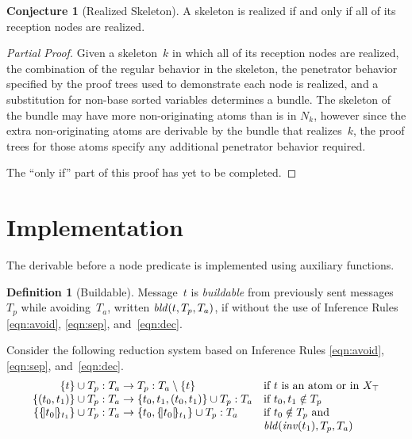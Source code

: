 \documentclass[12pt]{report}
\theoremstyle{definition}
\newtheorem{defn}{Definition}[chapter]
\newtheorem{conj}[thm]{Conjecture}
\begin{document}
\begin{conj}[Realized Skeleton]
A skeleton is realized if and only if all of its reception nodes are
realized.
\end{conj}

\begin{proof}[Partial Proof]
Given a skeleton~$k$ in which all of its reception nodes are realized,
the combination of the regular behavior in the skeleton, the
penetrator behavior specified by the proof trees used to demonstrate
each node is realized, and a substitution for non-base sorted
variables determines a bundle.  The skeleton of the bundle may have
more non-originating atoms than is in $N_k$, however since the
extra non-originating atoms are derivable by the bundle that
realizes~$k$, the proof trees for those atoms specify any additional
penetrator behavior required.

The ``only if'' part of this proof has yet to be completed.
\end{proof}

\section{Implementation}\label{sec:derivable implementation}

The derivable before a node predicate is implemented using auxiliary
functions.

\begin{defn}[Buildable]
Message~$t$ is \emph{buildable} from previously sent
messages~$T_p$ while avoiding~$T_a$, written $\operatorname{\mathit{bld}}(t,T_p,T_a)$, if
 without the use of Inference Rules \ref{eqn:avoid},
\ref{eqn:sep}, and~\ref{eqn:dec}.
\end{defn}

Consider the following reduction system based on Inference Rules
\ref{eqn:avoid}, \ref{eqn:sep}, and~\ref{eqn:dec}.
$$\begin{array}{r@{}c@{}ll}
\dctx{\{t\}\cup T_p}{T_a}&{}\to{}&\dctx{T_p}{T_a}\setminus\{t\}
&\mbox{if $t$ is an atom or in $X_{\top}$}\\
\dctx{\{(t_0,t_1)\}\cup T_p}{T_a}&{}\to{}
&\dctx{\{t_0,t_1,(t_0,t_1)\}\cup T_p}{T_a}
&\mbox{if $t_0,t_1\notin T_p$}\\
\dctx{\{\enc{t_0}{t_1}\}\cup
T_p}{T_a}&{}\to{}&\dctx{\{t_0,\enc{t_0}{t_1}\}\cup T_p}{T_a}
&\mbox{if $t_0\notin T_p$ and}\\
&&&\fn{bld}(\fn{inv}(t_1),T_p,T_a)
\end{array}$$
\end{document}
